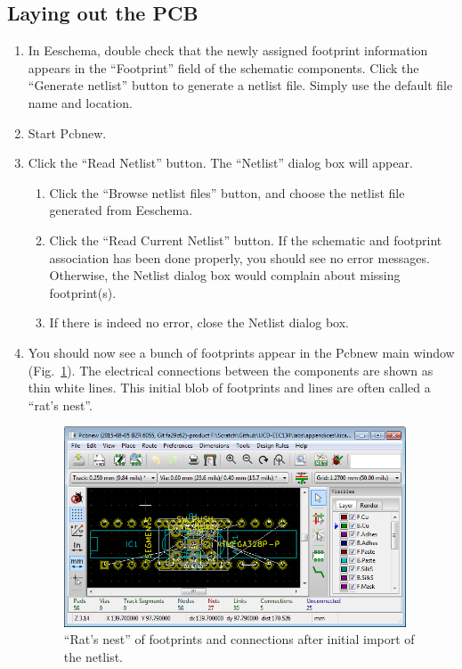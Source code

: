 \documentclass[12pt,letterpaper]{scrartcl}
\begin{document}
\subsection{Laying out the PCB}
\label{sec:pcb-layout}

\begin{enumerate}
	\item In Eeschema, double check that the newly assigned footprint information appears in the ``Footprint'' field of the schematic components. Click the ``Generate netlist'' button to generate a netlist file. Simply use the default file name and location. 
	\item Start Pcbnew. 
	\item Click the ``Read Netlist'' button. The ``Netlist'' dialog box will appear. 
		\begin{enumerate}
			\item Click the ``Browse netlist files'' button, and choose the netlist file generated from Eeschema. 
			
			\item Click the ``Read Current Netlist'' button. If the schematic and footprint association has been done properly, you should see no error messages. Otherwise, the Netlist dialog box would complain about missing footprint(s). 
			
			\item If there is indeed no error, close the Netlist dialog box. 
		\end{enumerate}
	\item You should now see a bunch of footprints appear in the Pcbnew main window (Fig.~\ref{fig:ratsnest}). The electrical connections between the components are shown as thin white lines. This initial blob of footprints and lines are often called a ``rat's nest''. 
		\begin{figure}[ht]
			\centering
			\includegraphics[width=4in]{ratsnest}
			\caption{``Rat's nest'' of footprints and connections after initial import of the netlist.}
			\label{fig:ratsnest}
		\end{figure}	
	

\end{enumerate}
\end{document}
